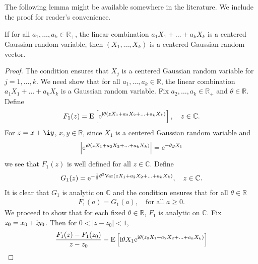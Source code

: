 \documentclass[12pt, reqno]{amsart}
\newcommand{\C}{{\mathbb{C}}}
\newcommand{\R}{{\mathbb{R}}}
\newcommand{\E}{\mathrm{E}}
\newcommand{\<}{\langle}
\renewcommand{\>}{\rangle}
\newcommand{\e}{\mathrm{e}}
\newcommand{\Var}{\text{\rm Var}}
\begin{document}
\begin{appendix}
\section{}
The following lemma might be available somewhere in the literature.  We include the proof for reader's convenience. 


\begin{lemma}\label{Gauss-linear}
          If for all $a_1, \ldots, a_k\in \R_+$, the linear 
          combination $a_1X_1+\ldots + a_kX_k$ is a centered Gaussian random variable, then $(X_1, \ldots, X_k)$ is a centered 
          Gaussian random
          vector. 
\end{lemma}
\begin{proof}
          The condition ensures that $X_j$ is a centered Gaussian random variable for $j=1, \ldots, k$.
          We need show that for all $a_1, \ldots, a_k\in \R$, the linear 
          combination $a_1X_1+\ldots + a_kX_k$ is a Gaussian random variable. 
          Fix $a_2, \ldots, a_k \in \R_+$  and $\theta\in \R$. Define
          \begin{align*}
          F_1(z)= \E\left[\e^{{\rm i}\theta (zX_1+a_2X_2+\ldots+ a_kX_k)}\right],\quad z\in \C.
          \end{align*}
          For $z=x+\i y$, $x,y\in\R$, since $X_1$ is a centered Gaussian random variable and
          \begin{align*}
          \left| \e^{{\rm i}\theta (zX_1+a_2X_2+\ldots+a_kX_k)} \right| =\e^{-\theta yX_1}
          \end{align*}
          we see that $F_1(z)$ is well defined for all $z\in \C$. Define
          \begin{align*}
          G_1(z)= \e^{-\frac12\theta^2\Var(zX_1+a_2X_2+\ldots+ a_kX_k)}, \quad z\in \C.
          \end{align*}
          It is clear that $G_1$ is analytic on $\C$ and the condition ensures that for all $\theta\in \R$
          \begin{align}\label{ID}
          F_1(a)=G_1(a), \quad \text{for all $a\geq0$}. 
          \end{align}
          We proceed to show that for each fixed $\theta\in \R$, $F_1$ is 
analytic on $\C$. Fix $z_0=x_0+{\rm i} y_0$. 
          Then for $0<|z-z_0|<1$,
          \begin{align*}
          &\frac{F_1(z)-F_1(z_0)}{z-z_0} - \E\left[ {\rm i} \theta X_1\e^{ {\rm i}  \theta(z_0X_1+a_2X_2+\ldots +a_kX_k)} \right] \\

\end{align*}
\end{proof}
\end{appendix}
\end{document}
